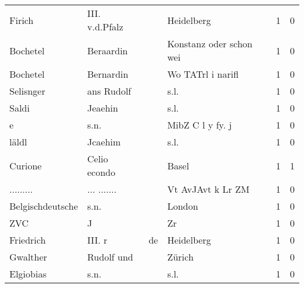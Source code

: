 \begin{tabular}{llllrr}
                   Firich &                     III. v.d.Pfalz &             &                                  Heidelberg &          1 &         0 \\
                 Bochetel &                          Beraardin &             &                     Konstanz oder schon wei &          1 &         0 \\
                 Bochetel &                          Bernardin &             &                           Wo TATrl i narifl &          1 &         0 \\
                Selisnger &                         ans Rudolf &             &                                        s.l. &          1 &         0 \\
                    Saldi &                            Jeaehin &             &                                        s.l. &          1 &         0 \\
                        e &                               s.n. &             &                            MibZ C l y fy. j &          1 &         0 \\
                    läldl &                            Jcaehim &             &                                        s.l. &          1 &         0 \\
                  Curione &                       Celio econdo &             &                                       Basel &          1 &         1 \\
                ......... &                        ... ....... &             &                           Vt AvJAvt k Lr ZM &          1 &         0 \\
         Belgischdeutsche &                               s.n. &             &                                      London &          1 &         0 \\
                      ZVC &                                  J &             &                                          Zr &          1 &         0 \\
                Friedrich &                            III.  r &          de &                                  Heidelberg &          1 &         0 \\
                 Gwalther &                         Rudolf und &             &                                      Zürich &          1 &         0 \\
                Elgiobias &                               s.n. &             &                                        s.l. &          1 &         0 \\

\end{tabular}
